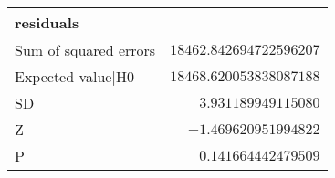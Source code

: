 \begin{table}[!tbp]
\begin{center}
\begin{tabular}{lr}
\hline\hline
\multicolumn{1}{l}{residuals}&\multicolumn{1}{c}{}\tabularnewline
\hline
Sum of squared errors&$18462.842694722596207$\tabularnewline
Expected value|H0&$18468.620053838087188$\tabularnewline
SD&$    3.931189949115080$\tabularnewline
Z&$   -1.469620951994822$\tabularnewline
P&$    0.141664442479509$\tabularnewline
\hline
\end{tabular}\end{center}

\end{table}
